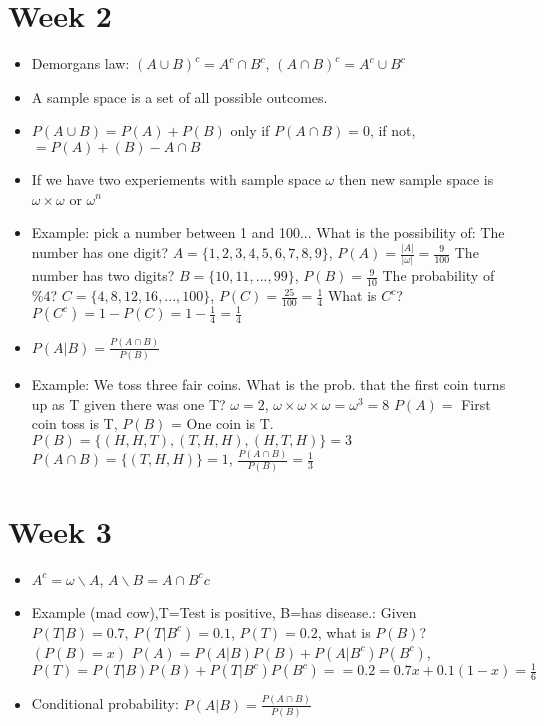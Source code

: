 \documentclass[12pt]{article}
\begin{document}
    \section{Week 2}
    \begin{itemize}
        \setlength\itemsep{0.1em}
        \item Demorgans law: $(A \cup B)^c = A^c \cap B^c$, $(A \cap B)^c = A^c \cup B^c$
        \item A sample space is a set of all possible outcomes.
        \item $P(A \cup B) = P(A) + P(B)$ only if $P (A \cap B) = 0$, if not, $= P(A) + (B) - A \cap B$
        \item If we have two experiements with sample space $\omega$ then new sample space is $ \omega \times \omega $ or $ \omega ^n $
        \item Example: pick a number between 1 and 100... What is the possibility of: \newline
        The number has one digit? $A=\{1,2,3,4,5,6,7,8,9\}$, $P(A) = \frac{|A|}{|\omega|} = \frac{9}{100}$ \newline
        The number has two digits? $B=\{10,11,...,99\}$, $P(B) = \frac{9}{10}$ \newline
        The probability of $ \% 4$? $C=\{4,8,12,16,...,100\}$, $P(C) = \frac{25}{100} = \frac{1}{4}$ \newline
        What is $C^c$? $P(C^c) = 1 - P(C) = 1 - \frac{1}{4} = \frac{1}{4}$
        \item $P(A|B) = \frac{P(A \cap B)}{P(B)}$
        \item Example: We toss three fair coins. What is the prob. that the first coin turns up as T given there was one T? \newline
        $\omega = 2$, $\omega \times \omega \times \omega = \omega^3 = 8$ \newline
        $P(A) =$ First coin toss is T, $P(B)$ = One coin is T. \newline
        $P(B) = \{(H,H,T),(T,H,H),(H,T,H)\} = 3$ \newline
        $P(A \cap B) = \{(T,H,H)\}  = 1$, $\frac{P(A \cap B)}{P(B)} = \frac{1}{3}$
    \end{itemize}


    \section{Week 3}
    \begin{itemize}
        \setlength\itemsep{0.1em}
        \item $A^c = \omega \backslash A$, $A \backslash B = A \cap B^c c$
        \item Example (mad cow),T=Test is positive, B=has disease.: Given $P(T|B) = 0.7$, $P(T|B^c) = 0.1$, $P(T) = 0.2$, what is $P(B)$? $(P(B) = x)$ \newline
        $P(A) = P(A|B)P(B) + P(A|B^c)P(B^c)$, $P(T) = P(T|B)P(B) + P(T|B^c)P(B^c) == 0.2 = 0.7x + 0.1(1-x) = \frac{1}{6}$
        \item Conditional probability: $P(A|B) = \frac{P(A \cap B)}{P(B)}$
    \end{itemize}
\end{document}
